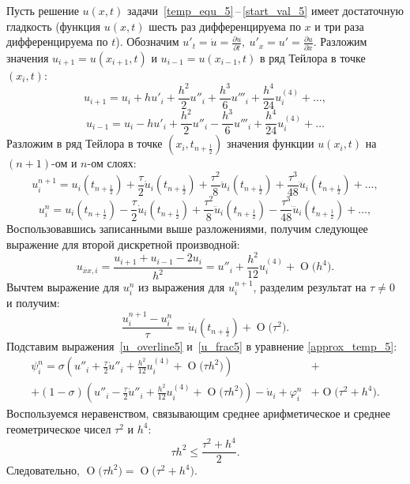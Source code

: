 \documentclass[11pt,a4paper,twoside]{report}
\numberwithin{equation}{section}
\theoremstyle{definition}
\theoremstyle{plain}
\newcommand{\bigO}[1]{\ensuremath{\operatorname{O}\bigl(#1\bigr)}}
\begin{document}
Пусть решение
$u(x, t)$ задачи~\eqref{temp_equ_5}\,--\,\eqref{start_val_5} имеет
достаточную гладкость (функция $u(x, t)$ шесть раз дифференцируема по $x$ и три раза
дифференцируема по $t$). Обозначим $u'_t = \dot u = \frac{\partial u}{\partial t},
~u'_x = u' = \frac{\partial u}{\partial x}$. Разложим значения
$u_{i+1} = u(x_{i+1},t)$ и $u_{i-1} = u(x_{i-1},t)$ в ряд
Тейлора в точке $(x_i, t)$:
%
$$
    u_{i+1} = u_i + hu'_i + \frac{h^2}{2}u''_i + \frac{h^3}{6}u'''_i +
    \frac{h^4}{24}u^{(4)}_i + \ldots,
$$
%
$$
    u_{i-1} = u_i - hu'_i + \frac{h^2}{2}u''_i - \frac{h^3}{6}u'''_i +
    \frac{h^4}{24}u^{(4)}_i + \ldots
$$
%
Разложим в ряд Тейлора в точке $(x_i, t_{n + \frac12})$ значения
функции $u(x_i,t)$ на $(n+1)$-ом и $n$-ом слоях:
%
$$
    u_i^{n+1} = u_i(t_{n+\frac12}) +
    \frac{\tau}{2}\dot{u}_i(t_{n+\frac12}) +
    \frac{\tau^2}{8}\ddot{u}_i(t_{n+\frac12}) +
    \frac{\tau^3}{48}\dddot{u}_i(t_{n+\frac12}) + \ldots,
$$
%
$$
    u_i^{n} = u_i(t_{n+\frac12}) -
    \frac{\tau}{2}\dot{u}_i(t_{n+\frac12}) +
    \frac{\tau^2}{8}\ddot{u}_i(t_{n+\frac12}) -
    \frac{\tau^3}{48}\dddot{u}_i(t_{n+\frac12}) + \ldots,
$$
%
Воспользовавшись записанными выше разложениями, получим следующее выражение для
второй дискретной производной:
%
\begin{equation}
%
    \label{u_overline5}
    u_{\overline{x}x,i} = \frac{u_{i+1} + u_{i-1} - 2u_i}{h^2} =
        u''_i + \dfrac{h^2}{12} u^{(4)}_i + \bigO{h^4}.
%
\end{equation}
%
Вычтем выражение для $u_i^{n}$ из выражения для $u_i^{n+1}$,
разделим результат на $\tau\neq0$ и получим:
%
\begin{equation}
%
    \label{u_frac5}
    \frac{u_i^{n+1} - u_i^n}{\tau} = \dot{u}_i(t_{n+\frac12}) + \bigO{\tau^2}.
%
\end{equation}
%
Подставим выражения~\eqref{u_overline5} и~\eqref{u_frac5} в уравнение
\eqref{approx_temp_5}:
%
\begin{equation}
%
    \label{psi_with_O1}
    \begin{split}
        \psi_i^n = \sigma\left(u''_i + \frac{\tau}{2}\dot{u}''_i +
        \frac{h^2}{12}u_i^{(4)} + \bigO{\tau h^2}\right) &+ \\
        + (1 - \sigma)\left(u''_i - \frac{\tau}{2}\dot{u}''_i +
        \frac{h^2}{12} u_i^{(4)} + \bigO{\tau h^2}\right) -
        \dot{u}_i + \varphi_i^n &+ \bigO{\tau^2 + h^4}.
    \end{split}
%
\end{equation}
%
Воспользуемся неравенством, связывающим среднее арифметическое и среднее геометрическое
чисел $\tau^2$ и $h^4$:
%
$$
    \tau h^2 \leqslant \frac{\tau^2 + h^4}{2}.
$$
%
Следовательно, $\bigO{\tau h^2} = \bigO{\tau^2 + h^4}$.
\end{document}
